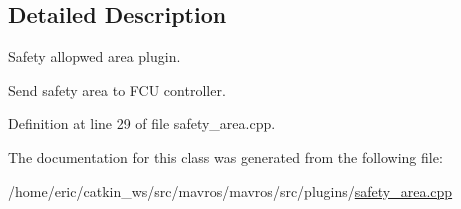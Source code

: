 \subsection{Detailed Description}
Safety allopwed area plugin. 

Send safety area to F\+CU controller. 

Definition at line 29 of file safety\+\_\+area.\+cpp.



The documentation for this class was generated from the following file\+:\begin{DoxyCompactItemize}
\item 
/home/eric/catkin\+\_\+ws/src/mavros/mavros/src/plugins/\mbox{\hyperlink{safety__area_8cpp}{safety\+\_\+area.\+cpp}}\end{DoxyCompactItemize}
